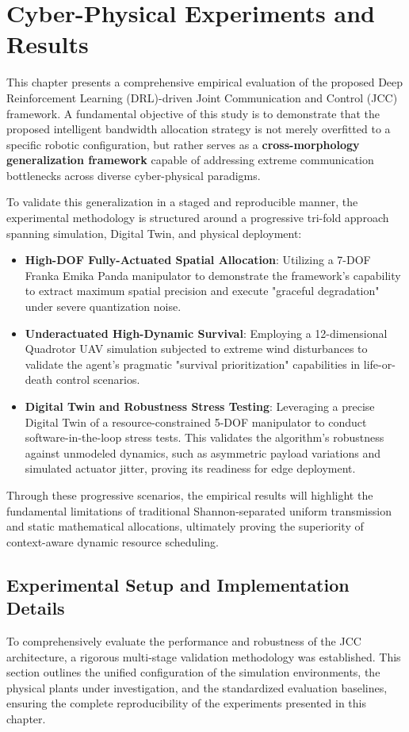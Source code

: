 \section{Cyber-Physical Experiments and Results}
This chapter presents a comprehensive empirical evaluation of the proposed Deep Reinforcement Learning (DRL)-driven Joint Communication and Control (JCC) 
framework. A fundamental objective of this study is to demonstrate that the proposed intelligent bandwidth allocation strategy is not merely overfitted to a specific 
robotic configuration, but rather serves as a \textbf{cross-morphology generalization framework} capable of addressing extreme communication bottlenecks across diverse cyber-physical paradigms.

To validate this generalization in a staged and reproducible manner, the experimental methodology is structured around a progressive tri-fold approach spanning simulation, Digital Twin, and physical deployment:
\begin{itemize}
    \item \textbf{High-DOF Fully-Actuated Spatial Allocation}: Utilizing a 7-DOF Franka Emika Panda manipulator to demonstrate the framework's capability to extract maximum spatial precision and execute "graceful degradation" under severe quantization noise.
    \item \textbf{Underactuated High-Dynamic Survival}: Employing a 12-dimensional Quadrotor UAV simulation subjected to extreme wind disturbances to validate the agent's pragmatic "survival prioritization" capabilities in life-or-death control scenarios.
    \item \textbf{Digital Twin and Robustness Stress Testing}: Leveraging a precise Digital Twin of a resource-constrained 5-DOF manipulator to conduct software-in-the-loop stress tests. This validates the algorithm's robustness against unmodeled dynamics, such as asymmetric payload variations and simulated actuator jitter, proving its readiness for edge deployment. 
\end{itemize}
Through these progressive scenarios, the empirical results will highlight the fundamental limitations of traditional Shannon-separated uniform transmission and static mathematical allocations, 
ultimately proving the superiority of context-aware dynamic resource scheduling.
\subsection{Experimental Setup and Implementation Details}
To comprehensively evaluate the performance and robustness of the JCC architecture, a rigorous multi-stage validation methodology 
was established. This section outlines the unified configuration of the simulation environments, the physical plants under investigation,
and the standardized evaluation baselines, ensuring the complete reproducibility of the experiments presented in this chapter.
